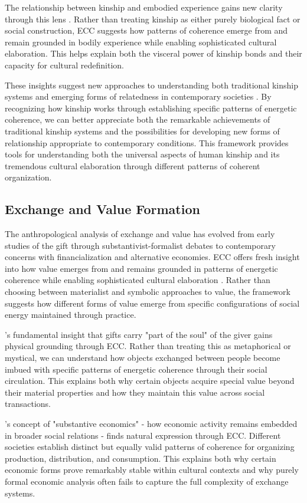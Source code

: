 \begin{refsection}
The relationship between kinship and embodied experience gains new clarity through this lens \cite{strathern1992after}. Rather than treating kinship as either purely biological fact or social construction, ECC suggests how patterns of coherence emerge from and remain grounded in bodily experience while enabling sophisticated cultural elaboration. This helps explain both the visceral power of kinship bonds and their capacity for cultural redefinition.

These insights suggest new approaches to understanding both traditional kinship systems and emerging forms of relatedness in contemporary societies \cite{carsten2000cultures}. By recognizing how kinship works through establishing specific patterns of energetic coherence, we can better appreciate both the remarkable achievements of traditional kinship systems and the possibilities for developing new forms of relationship appropriate to contemporary conditions. This framework provides tools for understanding both the universal aspects of human kinship and its tremendous cultural elaboration through different patterns of coherent organization.

\subsection{Exchange and Value Formation}

The anthropological analysis of exchange and value has evolved from early studies of the gift through substantivist-formalist debates to contemporary concerns with financialization and alternative economies. ECC offers fresh insight into how value emerges from and remains grounded in patterns of energetic coherence while enabling sophisticated cultural elaboration \cite{mauss1925gift}. Rather than choosing between materialist and symbolic approaches to value, the framework suggests how different forms of value emerge from specific configurations of social energy maintained through practice.

\cite{mauss1925gift}'s fundamental insight that gifts carry "part of the soul" of the giver gains physical grounding through ECC. Rather than treating this as metaphorical or mystical, we can understand how objects exchanged between people become imbued with specific patterns of energetic coherence through their social circulation. This explains both why certain objects acquire special value beyond their material properties and how they maintain this value across social transactions.

\cite{polanyi1944great}'s concept of "substantive economics" - how economic activity remains embedded in broader social relations - finds natural expression through ECC. Different societies establish distinct but equally valid patterns of coherence for organizing production, distribution, and consumption. This explains both why certain economic forms prove remarkably stable within cultural contexts and why purely formal economic analysis often fails to capture the full complexity of exchange systems.


\end{refsection}
